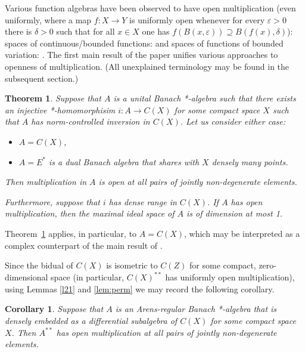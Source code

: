 \documentclass[12pt,fleqn]{amsart}
\newtheorem{corollary}[theorem]{Corollary}
\newcounter{maintheorem}
\newtheorem{mainth}[maintheorem]{Theorem}
\theoremstyle{definition}
\numberwithin{equation}{section}
\theoremstyle{remark}
\begin{document}
Various function algebras have been observed to have open multiplication (even uniformly, where a map $f\colon X\to Y$ is uniformly open whenever for every $\varepsilon > 0$ there is $\delta > 0$ such that for all $x\in X$ one has $f(B(x,\varepsilon)) \supseteq B(f(x), \delta)$): spaces of continuous/bounded functions: \cite{balcerzak2016certain, balcerzak2011multiplication, balcerzak2005multiplying, behrends2011walk, behrends2011products, botelho2019topological, komisarski2006connection, renaud2019topological} and spaces of functions of bounded variation: \cite{canarias2021multiplication, kowalczyk2019multiplication}. The first main result of the paper unifies various approaches to openness of multiplication. (All unexplained terminology may be found in the subsequent section.)

\begin{mainth}\label{thm:A}
    Suppose that $A$ is a unital Banach *-algebra such that there exists an injective *-homomorphisim $i\colon A\to C(X)$ for some compact space $X$ such that $A$ has norm-controlled inversion in $C(X)$. Let us consider either case:
    \begin{itemize}
        \item $A = C(X)$, 
        \item $A = E^*$ is a dual Banach algebra that shares with $X$ densely many points.
    \end{itemize}
    Then multiplication in $A$ is open at all pairs of jointly non-degenerate elements. 
    
    {Furthermore, suppose that $i$ has dense range in $C(X)$. If $A$ has open multiplication, then the maximal ideal space of $A$ is of dimension at most 1.}\end{mainth}
    
Theorem~\ref{thm:A} applies, in particular, to $A = C(X)$, which may be interpreted as a complex counterpart of the main result of \cite{behrends2017pointwise}.\medskip

{Since the bidual of $C(X)$ is isometric to $C(Z)$ for some compact, zero-dimensional space (in particular, $C(X)^{**}$ has uniformly open multiplication), using Lemmas \ref{l21} and \ref{lem:perm} we may record the following corollary.}
%
%
{\begin{corollary}
  Suppose that $A$ is an Arens-regular Banach *-algebra that is densely embedded as a differential subalgebra of $C(X)$ for some compact space $X$. Then $A^{**}$ has open multiplication at all pairs of jointly non-degenerate elements.
\end{corollary}}
\end{document}
